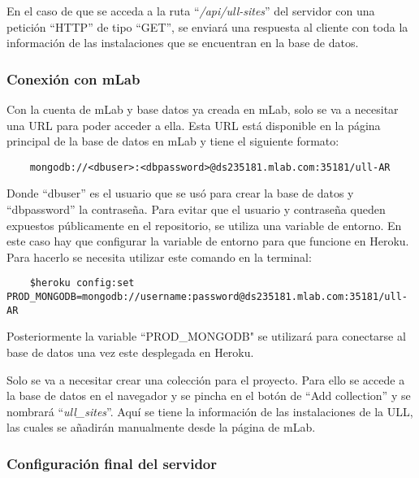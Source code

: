En el caso de que se acceda a la ruta ``\textit{/api/ull-sites}'' del servidor con una petición ``HTTP'' de tipo ``GET'', se enviará una respuesta al cliente con toda la información de las instalaciones que se encuentran en la base de datos.

\bigskip


\subsubsection{Conexión con mLab}

Con la cuenta de mLab y base datos ya creada en mLab, solo se va a necesitar una URL para poder acceder a ella. Esta URL está disponible en la página principal de la base de datos en mLab y tiene el siguiente formato:

\begin{lstlisting}
    mongodb://<dbuser>:<dbpassword>@ds235181.mlab.com:35181/ull-AR
\end{lstlisting}

Donde ``dbuser'' es el usuario que se usó para crear la base de datos y ``dbpassword'' la contraseña. Para evitar que el usuario y contraseña queden expuestos públicamente en el repositorio, se utiliza una variable de entorno. En este caso hay que configurar la variable de entorno para que funcione en Heroku. Para hacerlo se necesita utilizar este comando en la terminal:

\begin{lstlisting}
    $heroku config:set PROD_MONGODB=mongodb://username:password@ds235181.mlab.com:35181/ull-AR
\end{lstlisting}

Posteriormente la variable ``PROD\_MONGODB" se utilizará para conectarse al base de datos una vez este desplegada en Heroku.

Solo se va a necesitar crear una colección para el proyecto. Para ello se accede a la base de datos en el navegador y se pincha en el botón de ``Add collection'' y se nombrará ``\textit{ull\_sites}''. Aquí se tiene la información de las instalaciones de la ULL, las cuales se añadirán manualmente desde la página de mLab.


\subsubsection{Configuración final del servidor}

